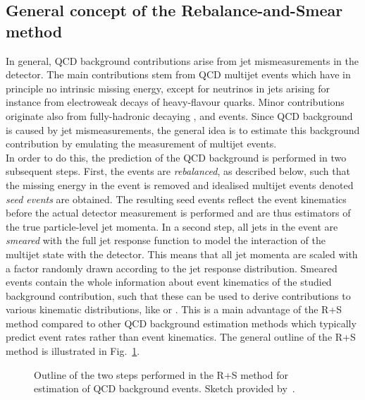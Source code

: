 \subsection{General concept of the Rebalance-and-Smear method}
\label{subsec:RPlusS_concept} 
In general, QCD background contributions arise from jet mismeasurements in the detector. The main contributions stem from QCD multijet events which have in principle no intrinsic missing energy, except for neutrinos in jets arising for instance from electroweak decays of heavy-flavour quarks. Minor contributions originate also from fully-hadronic decaying \ttbar, \WJets and \ZJets events. Since QCD background is caused by jet mismeasurements, the general idea is to estimate this background contribution by emulating the measurement of multijet events. \\
In order to do this, the prediction of the QCD background is performed in two subsequent steps. First, the events are \textit{rebalanced}, as described below, such that the missing energy in the event is removed and idealised multijet events denoted \textit{seed events} are obtained. The resulting seed events reflect the event kinematics before the actual detector measurement is performed and are thus estimators of the true particle-level jet momenta. In a second step, all jets in the event are \textit{smeared} with the full jet response function to model the interaction of the multijet state with the detector. This means that all jet momenta are scaled with a factor randomly drawn according to the jet response distribution. Smeared events contain the whole information about event kinematics of the studied background contribution, such that these can be used to derive contributions to various kinematic distributions, like \HT or \MHT. This is a main advantage of the R+S method compared to other QCD background estimation methods which typically predict event rates rather than event kinematics. The general outline of the R+S method is illustrated in Fig.~\ref{fig:RPlusS_concept}.
\begin{figure}[!t]
  \centering
  \caption{Outline of the two steps performed in the R+S method for estimation of QCD background events. Sketch provided by~\cite{MSchrode}.}
  \label{fig:RPlusS_concept}
\end{figure}

